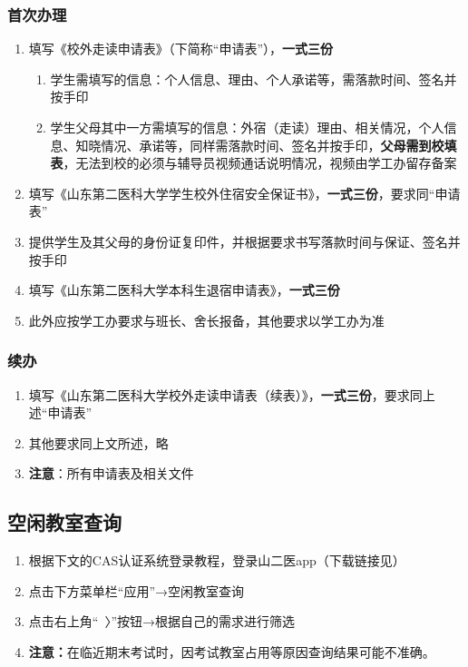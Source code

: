 \subsubsection[首次办理]{首次办理}
\begin{enumerate}
    \item 填写《校外走读申请表》（下简称“申请表”），\textbf{一式三份}
          \begin{enumerate}
              \item 学生需填写的信息：个人信息、理由、个人承诺等，需落款时间、签名并按手印
              \item 学生父母其中一方需填写的信息：外宿（走读）理由、相关情况，个人信息、知晓情况、承诺等，同样需落款时间、签名并按手印，\textbf{父母需到校填表}，无法到校的必须与辅导员视频通话说明情况，视频由学工办留存备案
          \end{enumerate}
    \item 填写《山东第二医科大学学生校外住宿安全保证书》，\textbf{一式三份}，要求同“申请表”
    \item 提供学生及其父母的身份证复印件，并根据要求书写落款时间与保证、签名并按手印
    \item 填写《山东第二医科大学本科生退宿申请表》，\textbf{一式三份}
    \item 此外应按学工办要求与班长、舍长报备，其他要求以学工办为准
\end{enumerate}

\subsubsection[续办]{续办}
\begin{enumerate}
    \item 填写《山东第二医科大学校外走读申请表（续表）》，\textbf{一式三份}，要求同上述“申请表”
    \item 其他要求同上文所述，略
    \item \textbf{注意}：所有申请表及相关文件
\end{enumerate}

\subsection[空闲教室查询]{空闲教室查询}
\label{spare_classroom}
\begin{enumerate}
    \item 根据下文的CAS认证系统登录教程，登录山二医app（下载链接见）
    \item 点击下方菜单栏“应用”→空闲教室查询
    \item 点击右上角“\ 〉”按钮→根据自己的需求进行筛选
    \item \textbf{注意：}在临近期末考试时，因考试教室占用等原因查询结果可能不准确。
\end{enumerate}

